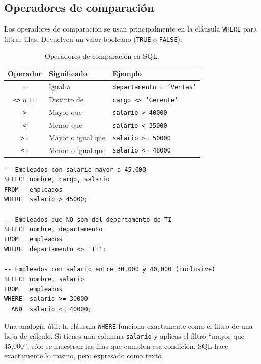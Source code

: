 \subsection{Operadores de comparación}

Los operadores de comparación se usan principalmente en la cláusula
\texttt{WHERE} para filtrar filas.
Devuelven un valor booleano (\texttt{TRUE} o \texttt{FALSE}):

\begin{table}[H]
\centering
\small
\renewcommand{\arraystretch}{1.4}
\begin{tabularx}{\linewidth}{@{} c l X @{}}
\toprule
\textbf{Operador} & \textbf{Significado} & \textbf{Ejemplo} \\
\midrule
\texttt{=}    & Igual a              & \texttt{departamento = 'Ventas'} \\
\texttt{<>} o \texttt{!=} & Distinto de & \texttt{cargo <> 'Gerente'} \\
\texttt{>}    & Mayor que            & \texttt{salario > 40000} \\
\texttt{<}    & Menor que            & \texttt{salario < 35000} \\
\texttt{>=}   & Mayor o igual que    & \texttt{salario >= 50000} \\
\texttt{<=}   & Menor o igual que    & \texttt{salario <= 48000} \\
\bottomrule
\end{tabularx}
\caption{Operadores de comparación en SQL.}
\label{tab:operadores-comparacion}
\end{table}

\begin{lstlisting}[caption={Filtros con operadores de comparación.}]
-- Empleados con salario mayor a 45,000
SELECT nombre, cargo, salario
FROM   empleados
WHERE  salario > 45000;

-- Empleados que NO son del departamento de TI
SELECT nombre, departamento
FROM   empleados
WHERE  departamento <> 'TI';

-- Empleados con salario entre 30,000 y 40,000 (inclusive)
SELECT nombre, salario
FROM   empleados
WHERE  salario >= 30000
  AND  salario <= 40000;
\end{lstlisting}

\begin{ejemplo}
Una analogía útil: la cláusula \texttt{WHERE} funciona exactamente
como el filtro de una hoja de cálculo.
Si tienes una columna \texttt{salario} y aplicas el filtro
``mayor que 45,000'', sólo se muestran las filas que cumplen esa
condición. SQL hace exactamente lo mismo, pero expresado como texto.
\end{ejemplo}

